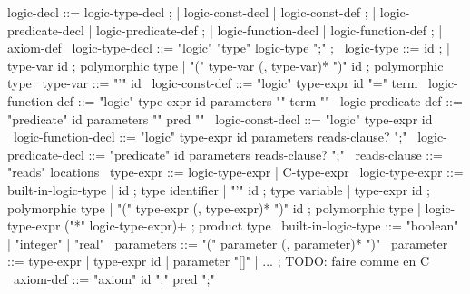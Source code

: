\begin{syntax}
  logic-decl ::= logic-type-decl ;
          | logic-const-decl | logic-const-def ;
          | logic-predicate-decl | logic-predicate-def ;
          | logic-function-decl | logic-function-def ;
          | axiom-def
  \
  logic-type-decl ::= "logic" "type" logic-type ";" ; 
  \
  logic-type ::= id ;
  | type-var id ; polymorphic type
  | "(" type-var (, type-var)* ")" id ; polymorphic type
  \
  type-var ::= "'" id 
  \
  logic-const-def ::= "logic" type-expr id "=" term
  \
  logic-function-def ::= "logic" type-expr id parameters "{" term "}"
  \
  logic-predicate-def ::= "predicate" id parameters "{" pred "}"
  \
  logic-const-decl ::= "logic" type-expr id 
  \
  logic-function-decl ::= "logic" type-expr id parameters reads-clause? ";"
  \
  logic-predicate-decl ::= "predicate" id parameters reads-clause? ";"
  \
  reads-clause ::= "reads" locations
  \
  type-expr ::= logic-type-expr | C-type-expr
  \
  logic-type-expr ::= built-in-logic-type 
  | id ; type identifier
  | "'" id ; type variable
  | type-expr id ; polymorphic type                 
  | "(" type-expr (, type-expr)* ")" id ; polymorphic type
  | logic-type-expr ("*" logic-type-expr)+  ; product type 
  \
  built-in-logic-type ::= "boolean" | "integer" | "real" 
  \
  parameters ::= "(" parameter (, parameter)* ")"
  \
  parameter ::= type-expr | type-expr id | parameter "[]" | ... ; TODO: faire comme en C
  \
  axiom-def ::= "axiom" id ":" pred ";"
\end{syntax}